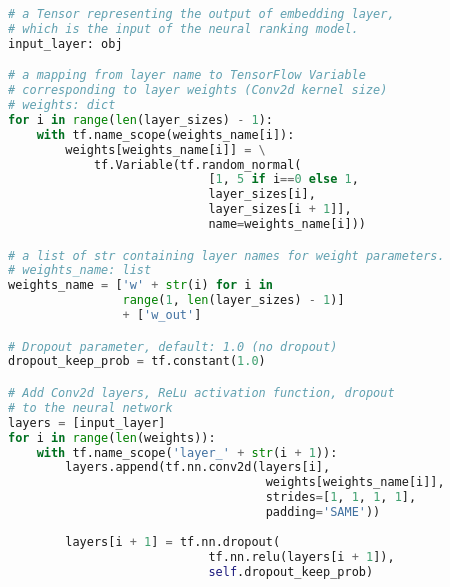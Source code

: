 \begin{lstlisting}[language=Python,frame=single,breaklines=true,float=tbh,caption=Neural network architecture of SNRM TensorFlow implementation,label=neural-network-architecture-tensorflow]
# a Tensor representing the output of embedding layer, 
# which is the input of the neural ranking model.
input_layer: obj

# a mapping from layer name to TensorFlow Variable 
# corresponding to layer weights (Conv2d kernel size)
# weights: dict 
for i in range(len(layer_sizes) - 1):
    with tf.name_scope(weights_name[i]):
        weights[weights_name[i]] = \
            tf.Variable(tf.random_normal(
                            [1, 5 if i==0 else 1, 
                            layer_sizes[i], 
                            layer_sizes[i + 1]],
                            name=weights_name[i]))

# a list of str containing layer names for weight parameters.
# weights_name: list
weights_name = ['w' + str(i) for i in 
                range(1, len(layer_sizes) - 1)] 
                + ['w_out']

# Dropout parameter, default: 1.0 (no dropout)
dropout_keep_prob = tf.constant(1.0)

# Add Conv2d layers, ReLu activation function, dropout
# to the neural network
layers = [input_layer]
for i in range(len(weights)):
    with tf.name_scope('layer_' + str(i + 1)):
        layers.append(tf.nn.conv2d(layers[i],
                                    weights[weights_name[i]],
                                    strides=[1, 1, 1, 1],
                                    padding='SAME'))
        
        layers[i + 1] = tf.nn.dropout(
                            tf.nn.relu(layers[i + 1]),
                            self.dropout_keep_prob)
\end{lstlisting}

